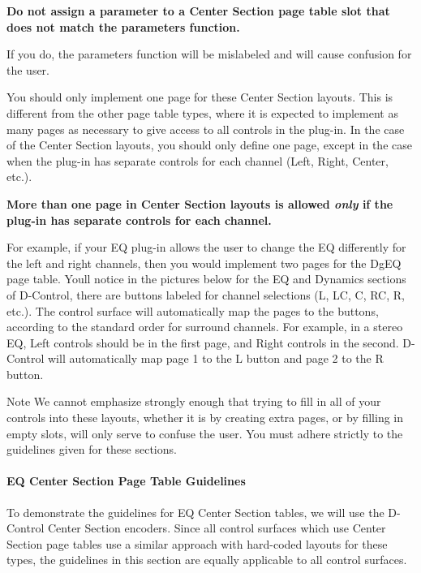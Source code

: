  {\bfseries{ Do not assign a parameter to a Center Section page table slot that does not match the parameter\textquotesingle{}s function.}} 

If you do, the parameter\textquotesingle{}s function will be mislabeled and will cause confusion for the user.

You should only implement one page for these Center Section layouts. This is different from the other page table types, where it is expected to implement as many pages as necessary to give access to all controls in the plug-\/in. In the case of the Center Section layouts, you should only define one page, except in the case when the plug-\/in has separate controls for each channel (Left, Right, Center, etc.).

 {\bfseries{ More than one page in Center Section layouts is allowed {\itshape  only} if the plug-\/in has separate controls for each channel.}} 

For example, if your EQ plug-\/in allows the user to change the EQ differently for the left and right channels, then you would implement two pages for the Dg\+EQ page table. You\textquotesingle{}ll notice in the pictures below for the EQ and Dynamics sections of D-\/\+Control, there are buttons labeled for channel selections (L, LC, C, RC, R, etc.). The control surface will automatically map the pages to the buttons, according to the standard order for surround channels. For example, in a stereo EQ, Left controls should be in the first page, and Right controls in the second. D-\/\+Control will automatically map page 1 to the L button and page 2 to the R button.

\begin{DoxyNote}{Note}
We cannot emphasize strongly enough that trying to fill in all of your controls into these layouts, whether it is by creating extra pages, or by filling in empty slots, will only serve to confuse the user. You must adhere strictly to the guidelines given for these sections.
\end{DoxyNote}
\hypertarget{a00833_aax_page_table_guide_04_avid_center_section_page_tables_guidelines_eq}{}\paragraph{E\+Q Center Section Page Table Guidelines}\label{a00833_aax_page_table_guide_04_avid_center_section_page_tables_guidelines_eq}
 To demonstrate the guidelines for EQ Center Section tables, we will use the D-\/\+Control Center Section encoders. Since all control surfaces which use Center Section page tables use a similar approach with hard-\/coded layouts for these types, the guidelines in this section are equally applicable to all control surfaces.


